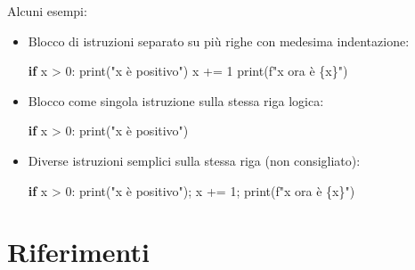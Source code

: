 \documentclass[
  letterpaper,
]{scrbook}
\newenvironment{Shaded}{\begin{snugshade}}{\end{snugshade}}
\newcommand{\BuiltInTok}[1]{\textcolor[rgb]{0.00,0.23,0.31}{#1}}
\newcommand{\ControlFlowTok}[1]{\textcolor[rgb]{0.00,0.23,0.31}{\textbf{#1}}}
\newcommand{\DecValTok}[1]{\textcolor[rgb]{0.68,0.00,0.00}{#1}}
\newcommand{\NormalTok}[1]{\textcolor[rgb]{0.00,0.23,0.31}{#1}}
\newcommand{\OperatorTok}[1]{\textcolor[rgb]{0.37,0.37,0.37}{#1}}
\newcommand{\SpecialCharTok}[1]{\textcolor[rgb]{0.37,0.37,0.37}{#1}}
\newcommand{\SpecialStringTok}[1]{\textcolor[rgb]{0.13,0.47,0.30}{#1}}
\newcommand{\StringTok}[1]{\textcolor[rgb]{0.13,0.47,0.30}{#1}}
\begin{document}
Alcuni esempi:

\begin{itemize}
\item
  Blocco di istruzioni separato su più righe con medesima indentazione:

\begin{Shaded}
\begin{Highlighting}[]
\ControlFlowTok{if}\NormalTok{ x }\OperatorTok{\textgreater{}} \DecValTok{0}\NormalTok{:}
  \BuiltInTok{print}\NormalTok{(}\StringTok{"x è positivo"}\NormalTok{)}
\NormalTok{  x }\OperatorTok{+=} \DecValTok{1}
  \BuiltInTok{print}\NormalTok{(}\SpecialStringTok{f"x ora è }\SpecialCharTok{\{}\NormalTok{x}\SpecialCharTok{\}}\SpecialStringTok{"}\NormalTok{)}
\end{Highlighting}
\end{Shaded}
\item
  Blocco come singola istruzione sulla stessa riga logica:

\begin{Shaded}
\begin{Highlighting}[]
\ControlFlowTok{if}\NormalTok{ x }\OperatorTok{\textgreater{}} \DecValTok{0}\NormalTok{: }\BuiltInTok{print}\NormalTok{(}\StringTok{"x è positivo"}\NormalTok{)}
\end{Highlighting}
\end{Shaded}
\item
  Diverse istruzioni semplici sulla stessa riga (non consigliato):

\begin{Shaded}
\begin{Highlighting}[]
\ControlFlowTok{if}\NormalTok{ x }\OperatorTok{\textgreater{}} \DecValTok{0}\NormalTok{: }\BuiltInTok{print}\NormalTok{(}\StringTok{"x è positivo"}\NormalTok{)}\OperatorTok{;}\NormalTok{ x }\OperatorTok{+=} \DecValTok{1}\OperatorTok{;} \BuiltInTok{print}\NormalTok{(}\SpecialStringTok{f"x ora è }\SpecialCharTok{\{}\NormalTok{x}\SpecialCharTok{\}}\SpecialStringTok{"}\NormalTok{)}
\end{Highlighting}
\end{Shaded}
\end{itemize}

\cleardoublepage
{}
{}
\appendix

\chapter*{Riferimenti}\label{riferimenti}
\end{document}
